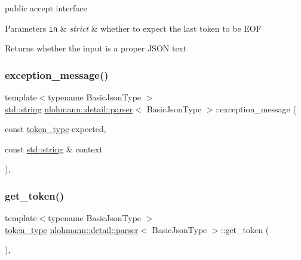public accept interface 


\begin{DoxyParams}[1]{Parameters}
\mbox{\tt in}  & {\em strict} & whether to expect the last token to be E\+OF \\
\hline
\end{DoxyParams}
\begin{DoxyReturn}{Returns}
whether the input is a proper J\+S\+ON text 
\end{DoxyReturn}
\mbox{\label{classnlohmann_1_1detail_1_1parser_a1328166d9e9b655399fdc890d47e4990}} 
\subsubsection{\texorpdfstring{exception\+\_\+message()}{exception\_message()}}
{\footnotesize\ttfamily template$<$typename Basic\+Json\+Type $>$ \\
\hyperlink{namespacenlohmann_1_1detail_a1ed8fc6239da25abcaf681d30ace4985ab45cffe084dd3d20d928bee85e7b0f21}{std\+::string} \hyperlink{classnlohmann_1_1detail_1_1parser}{nlohmann\+::detail\+::parser}$<$ Basic\+Json\+Type $>$\+::exception\+\_\+message (\begin{DoxyParamCaption}\item[{const \hyperlink{classnlohmann_1_1detail_1_1parser_a21d247111b332785b7acf3f8e487d117}{token\+\_\+type}}]{expected,  }\item[{const \hyperlink{namespacenlohmann_1_1detail_a1ed8fc6239da25abcaf681d30ace4985ab45cffe084dd3d20d928bee85e7b0f21}{std\+::string} \&}]{context }\end{DoxyParamCaption})\hspace{0.3cm}{\ttfamily [inline]}, {\ttfamily [private]}}

\mbox{\label{classnlohmann_1_1detail_1_1parser_a33f3859d0dd402445b5859070fd24bab}} 
\subsubsection{\texorpdfstring{get\+\_\+token()}{get\_token()}}
{\footnotesize\ttfamily template$<$typename Basic\+Json\+Type $>$ \\
\hyperlink{classnlohmann_1_1detail_1_1parser_a21d247111b332785b7acf3f8e487d117}{token\+\_\+type} \hyperlink{classnlohmann_1_1detail_1_1parser}{nlohmann\+::detail\+::parser}$<$ Basic\+Json\+Type $>$\+::get\+\_\+token (\begin{DoxyParamCaption}{ }\end{DoxyParamCaption})\hspace{0.3cm}{\ttfamily [inline]}, {\ttfamily [private]}}



